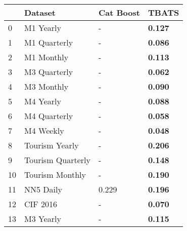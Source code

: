 \begin{tabular}{llll}
\toprule
 & Dataset & Cat Boost & TBATS \\
\midrule
0 & M1 Yearly & - & \textbf{0.127} \\
1 & M1 Quarterly & - & \textbf{0.086} \\
2 & M1 Monthly & - & \textbf{0.113} \\
3 & M3 Quarterly & - & \textbf{0.062} \\
4 & M3 Monthly & - & \textbf{0.090} \\
5 & M4 Yearly & - & \textbf{0.088} \\
6 & M4 Quarterly & - & \textbf{0.058} \\
7 & M4 Weekly & - & \textbf{0.048} \\
8 & Tourism Yearly & - & \textbf{0.206} \\
9 & Tourism Quarterly & - & \textbf{0.148} \\
10 & Tourism Monthly & - & \textbf{0.190} \\
11 & NN5 Daily & 0.229 & \textbf{0.196} \\
12 & CIF 2016 & - & \textbf{0.070} \\
13 & M3 Yearly & - & \textbf{0.115} \\
\bottomrule
\end{tabular}
